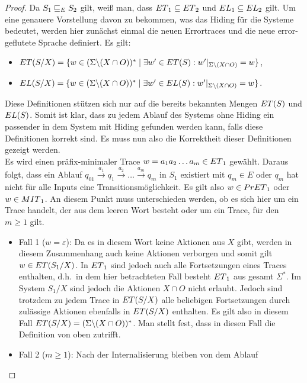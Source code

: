 \begin{proof}
  Da $S_1\sqsubseteq _E S_2$ gilt, weiß man, dass $ET{}_1\subseteq ET{}_2$ und
  $EL{}_1\subseteq EL{}_2$ gilt. Um eine genauere Vorstellung davon zu
  bekommen, was das Hiding für die Systeme bedeutet, werden hier zunächst
  einmal die neuen Errortraces und die neue error-geflutete Sprache definiert.
  Es gilt:
  \begin{itemize}
    \item $ET{}(S/X) = \{w\in (\Sigma\backslash (X\cap O))^*\mid \exists
      w'\in ET{}(S): w'|_{\Sigma\backslash (X\cap O)} = w\}$,
    \item $EL{}(S/X) = \{w\in (\Sigma\backslash (X\cap O))^*\mid \exists w'\in
      EL(S): w'|_{\Sigma\backslash (X\cap O)} = w\}$.
  \end{itemize}
  Diese Definitionen stützen sich nur auf die bereits bekannten Mengen
  $ET{}(S)$ und $EL{}(S)$. Somit ist klar, dass zu jedem Ablauf des Systems
  ohne Hiding ein passender in dem System mit Hiding gefunden werden kann,
  falls diese Definitionen korrekt sind. Es muss nun also die Korrektheit
  dieser Definitionen gezeigt werden.\\
  Es wird einen präfix-minimaler Trace $w=a_1a_2\dots a_m\in ET{}_1$ gewählt.
  Daraus folgt, dass ein Ablauf $q_{01} \overset{a_1}{\rightarrow} q_1
  \overset{a_2}{\rightarrow} \dots \overset{a_m}{\rightarrow} q_m$ in $S_1$
  existiert mit $q_m\in E$ oder $q_m$ hat nicht für alle Inputs eine
  Transitionsmöglichkeit. Es gilt also $w\in PrET{}_1$ oder $w\in MIT{}_1$.
  An diesem Punkt muss unterschieden werden, ob es sich hier um ein Trace
  handelt, der aus dem leeren Wort besteht oder um ein Trace, für den $m\geq 1$
  gilt.
  \begin{itemize}
    \item Fall 1 ($w=\varepsilon$): Da es in diesem Wort keine Aktionen aus $X$
      gibt, werden in diesem Zusammenhang auch keine Aktionen verborgen und
      somit gilt $w\in ET{}(S_1/X)$. In $ET{}_1$ sind jedoch auch alle
      Fortsetzungen eines Traces enthalten, d.h.\ in dem hier betrachteten Fall
      besteht $ET{}_1$ aus gesamt $\Sigma ^*$. Im System $S_1/X$ sind jedoch
      die Aktionen $X\cap O$ nicht erlaubt. Jedoch sind trotzdem zu jedem
      Trace in $ET{}(S/X)$ alle beliebigen Fortsetzungen durch zulässige
      Aktionen ebenfalls in $ET{}(S/X)$ enthalten. Es gilt also in diesem Fall
      $ET{}(S/X) = (\Sigma\backslash (X\cap O))^*$. Man stellt fest, dass in
      diesen Fall die Definition von oben zutrifft.
    \item Fall 2 ($m\geq 1$): Nach der Internalisierung bleiben von dem Ablauf

\end{itemize}
\end{proof}
